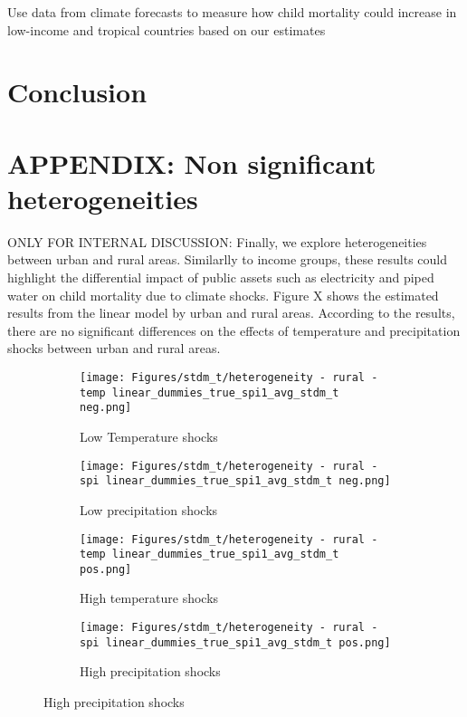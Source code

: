 \documentclass[a4paper]{article}
\begin{document}
Use data from climate forecasts to measure how child mortality could increase in low-income and tropical countries based on our estimates

\section{Conclusion}

\printbibliography

\clearpage
\appendix

\section{APPENDIX: Non significant heterogeneities}

ONLY FOR INTERNAL DISCUSSION:
Finally, we explore heterogeneities between urban and rural areas. Similarlly to income groups, these results could highlight the differential impact of public assets such as electricity and piped water on child mortality due to climate shocks. Figure X shows the estimated results from the linear model by urban and rural areas. According to the results, there are no significant differences on the effects of temperature and precipitation shocks between urban and rural areas. 

\begin{figure}[h!]
    \caption{Climate shocks impacts on different income groups}
    \centering
    \begin{subfigure}[t]{0.45\textwidth}
        \centering
        \texttt{[image: Figures/stdm\_t/heterogeneity - rural - temp linear\_dummies\_true\_spi1\_avg\_stdm\_t neg.png]}
        \caption{Low Temperature shocks}
    \end{subfigure}%
    \begin{subfigure}[t]{0.45\textwidth}
        \centering
        \texttt{[image: Figures/stdm\_t/heterogeneity - rural - spi linear\_dummies\_true\_spi1\_avg\_stdm\_t neg.png]}
        \caption{Low precipitation shocks}
    \end{subfigure} \hfill
    \begin{subfigure}[t]{0.45\textwidth}
        \centering
        \texttt{[image: Figures/stdm\_t/heterogeneity - rural - temp linear\_dummies\_true\_spi1\_avg\_stdm\_t pos.png]}
        \caption{High temperature shocks}    
    \end{subfigure}
    \begin{subfigure}[t]{0.45\textwidth}
        \centering
        \texttt{[image: Figures/stdm\_t/heterogeneity - rural - spi linear\_dummies\_true\_spi1\_avg\_stdm\_t pos.png]}
        \caption{High precipitation shocks}    
    \end{subfigure}
\end{figure}
\end{document}
